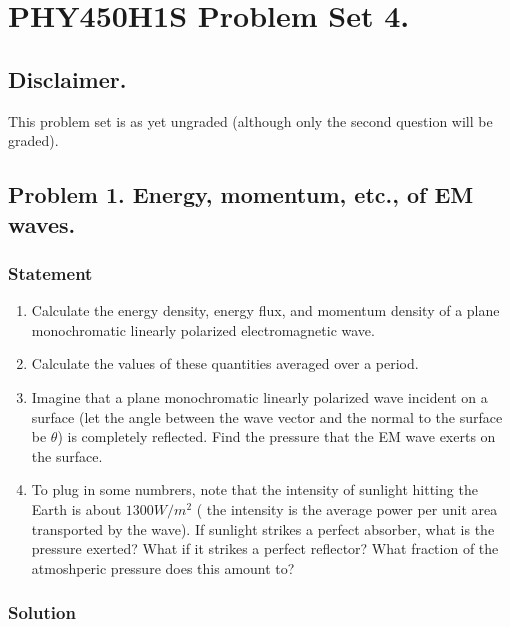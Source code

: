 
%

\chapter{PHY450H1S Problem Set 4.}
\label{chap:relElectroDynProblemSet4}
\date{Mar 3, 2011}

\beginArtWithToc

\section{Disclaimer.}

This problem set is as yet ungraded (although only the second question will be graded).

\section{Problem 1.  Energy, momentum, etc., of EM waves.}

\subsection{Statement}

\begin{enumerate}
\item Calculate the energy density, energy flux, and momentum density of a plane monochromatic linearly polarized electromagnetic wave.
\item Calculate the values of these quantities averaged over a period.
\item Imagine that a plane monochromatic linearly polarized wave incident on a surface (let the angle between the wave vector and the normal to the surface be $\theta$) is completely reflected.  Find the pressure that the EM wave exerts on the surface.
\item To plug in some numbrers, note that the intensity of sunlight hitting the Earth is about $1300 W/m^2$ ( the intensity is the average power per unit area transported by the wave).  If sunlight strikes a perfect absorber, what is the pressure exerted?  What if it strikes a perfect reflector?  What fraction of the atmoshperic pressure does this amount to?
\end{enumerate}
\subsection{Solution}
